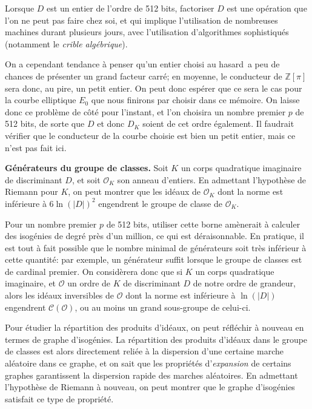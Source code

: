 \documentclass[11pt,a4paper]{article}
\newcommand{\Z}{\mathbb{Z}}
\renewcommand{\O}{\mathcal{O}}
\newcommand{\Cl}{\mathcal{C}}
\renewcommand{\v}{\vspace{5mm}}
\theoremstyle{definition}
\begin{document}
Lorsque $D$ est un entier de l'ordre de 512 bits, factoriser $D$ est une opération que l'on ne peut pas faire chez soi, et qui implique l'utilisation de nombreuses machines durant plusieurs jours, avec l'utilisation d'algorithmes sophistiqués (notamment le \emph{crible algébrique}).

On a cependant tendance à penser qu'un entier choisi \og au hasard\fg\ a peu de chances de présenter un grand facteur carré; en moyenne, le conducteur de $\Z[\pi]$ sera donc, au pire, un petit entier. On peut donc espérer que ce sera le cas pour la courbe elliptique $E_0$ que nous finirons par choisir dans ce mémoire. On laisse donc ce problème de côté pour l'instant, et l'on choisira un nombre premier $p$ de 512 bits, de sorte que $D$ et donc $D_K$ soient de cet ordre également. Il faudrait vérifier que le conducteur de la courbe choisie est bien un petit entier, mais ce n'est pas fait ici.

\v
\textbf{Générateurs du groupe de classes.}
Soit $K$ un corps quadratique imaginaire de discriminant $D$, et soit $\O_K$ son anneau d'entiers. En admettant l'hypothèse de Riemann pour $K$, on peut montrer que les idéaux de $\O_K$ dont la norme est inférieure à $6\ln(|D|)^2$ engendrent le groupe de classe de $\O_K$.

Pour un nombre premier $p$ de 512 bits, utiliser cette borne amènerait à calculer des isogénies de degré près d'un million, ce qui est déraisonnable. En pratique, il est tout à fait possible que le nombre minimal de générateurs soit très inférieur à cette quantité: par exemple, un générateur suffit lorsque le groupe de classes est de cardinal premier. On considèrera donc que si $K$ un corps quadratique imaginaire, et $\O$ un ordre de $K$ de discriminant $D$ de notre ordre de grandeur, alors les idéaux inversibles de $\O$ dont la norme est inférieure à $\ln(|D|)$ engendrent $\Cl(\O)$, ou au moins un grand sous-groupe de celui-ci.

\v
Pour étudier la répartition des produits d'idéaux, on peut réfléchir à nouveau en termes de graphe d'isogénies. La répartition des produits d'idéaux dans le groupe de classes est alors directement reliée à la dispersion d'une certaine marche aléatoire dans ce graphe, et on sait que les propriétés d'\emph{expansion} de certains graphes garantissent la dispersion rapide des marches aléatoires. En admettant l'hypothèse de Riemann à nouveau, on peut montrer que le graphe d'isogénies satisfait ce type de propriété. 
\end{document}
